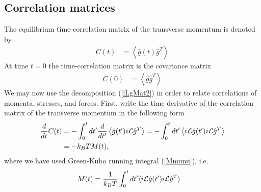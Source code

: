 \documentclass[b5paper,openright,10pt]{book}
\newcommand{\esc}{\!\cdot\!}
\newcommand{\llangle}{\left\langle}
\newcommand{\rrangle}{\right\rangle}
\begin{document}
\subsection{Correlation matrices}
The equilibrium time-correlation matrix of the transverse momentum is denoted by
\begin{align}
  C(t) &=  \llangle \hat{g}(t) \hat{g}^T \rrangle
\end{align}
At time  $t=0$ the time-correlation matrix is the covariance matrix
\begin{align}
C(0)&=   \llangle \hat{g}\hat{g}^T\rrangle 
\label{cov}
\end{align}
We may  now use  the decomposition (\ref{iLgMat2})  in order  to relate
correlations of momenta, stresses, and  forces. First, write the time
derivative of the correlation matrix of the transverse momentum in the
following form
\begin{align}
  \frac{d}{dt}C(t)&=  -\int_0^t dt' \frac{d}{dt'}\llangle \hat{g}(t') i{\cal L}\hat{g}^T\rrangle
=-  \int_0^t dt' \llangle i{\cal L}\hat{g}(t') i{\cal L}\hat{g}^T\rrangle
\nonumber\\
&=-  k_BT M(t),
\label{dCMt}
\end{align}
where we have used Green-Kubo running integral (\ref{Mmunu}), i.e.
\begin{align}
M(t)&= \frac{1}{k_BT}\int_0^t dt'\langle i{\cal L}\hat{g}(t')i{\cal L} \hat{g}^T\rangle
\label{Mmunut}
\end{align}
\end{document}
